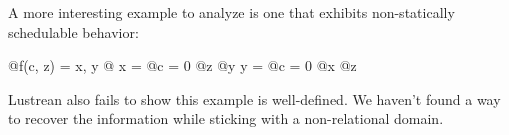 \documentclass{scrartcl}
\begin{document}
A more interesting example to analyze is one that exhibits non-statically schedulable behavior:
\begin{lustre}
@\Node@ f(c, z) = x, y @\Where@
  x = @\If@ c = 0 @\Then@ z @\Else@ y
  y = @\If@ c = 0 @\Then@ x @\Else@ z
\end{lustre}
Lustrean also fails to show this example is well-defined.  We haven't found a way to recover the
information while sticking with a non-relational domain.
\end{document}

